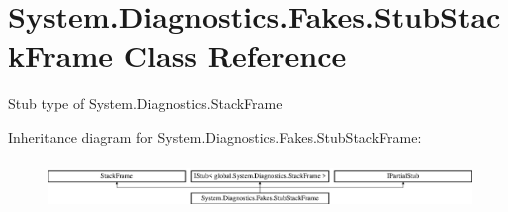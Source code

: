 \hypertarget{class_system_1_1_diagnostics_1_1_fakes_1_1_stub_stack_frame}{\section{System.\-Diagnostics.\-Fakes.\-Stub\-Stack\-Frame Class Reference}
\label{class_system_1_1_diagnostics_1_1_fakes_1_1_stub_stack_frame}
}


Stub type of System.\-Diagnostics.\-Stack\-Frame 


Inheritance diagram for System.\-Diagnostics.\-Fakes.\-Stub\-Stack\-Frame\-:\begin{figure}[H]
\begin{center}
\leavevmode
\includegraphics[height=1.287356cm]{class_system_1_1_diagnostics_1_1_fakes_1_1_stub_stack_frame}
\end{center}
\end{figure}
